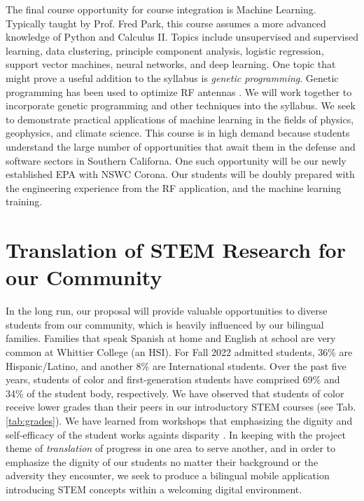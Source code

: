 \documentclass[../../main.tex]{subfiles}
\begin{document}
The final course opportunity for course integration is Machine Learning.  Typically taught by Prof. Fred Park, this course assumes a more advanced knowledge of Python and Calculus II.  Topics include unsupervised and supervised learning, data clustering, principle component analysis, logistic regression, support vector machines, neural networks, and deep learning.  One topic that might prove a useful addition to the syllabus is \textit{genetic programming}.  Genetic programming has been used to optimize RF antennas \cite{2016MsT.........58S,genetic}.  We will work together to incorporate genetic programming and other techniques into the syllabus.  We seek to demonstrate practical applications of machine learning in the fields of physics, geophysics, and climate science.  This course is in high demand because students understand the large number of opportunities that await them in the defense and software sectors in Southern Californa.  One such opportunity will be our newly established EPA with NSWC Corona.  Our students will be doubly prepared with the engineering experience from the RF application, and the machine learning training.

\section{Translation of STEM Research for our Community}
\label{sec:broad}

In the long run, our proposal will provide valuable opportunities to diverse students from our community, which is heavily influenced by our bilingual families.  Families that speak Spanish at home and English at school are very common at Whittier College (an HSI).  For Fall 2022 admitted students, 36\% are Hispanic/Latino, and another 8\% are International students.  Over the past five years, students of color and first-generation students have comprised 69\% and 34\% of the student body, respectively.  We have observed that students of color receive lower grades than their peers in our introductory STEM courses (see Tab. \ref{tab:grades}).  We have learned from workshops that emphasizing the dignity and self-efficacy of the student works againts disparity \cite{cottrell1,cottrell2}.  In keeping with the project theme of \textit{translation} of progress in one area to serve another, and in order to emphasize the dignity of our students no matter their background or the adversity they encounter, we seek to produce a bilingual mobile application introducing STEM concepts within a welcoming digital environment. \\ \vspace{2.5mm}
\end{document}
